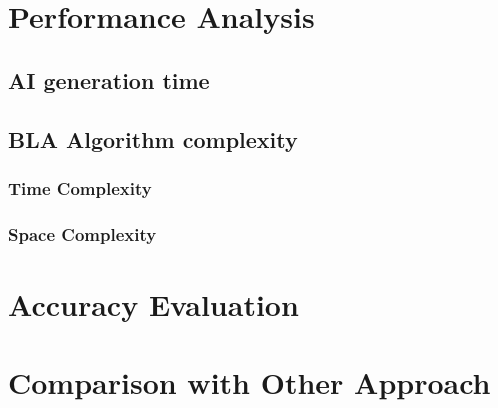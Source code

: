 \section{Performance Analysis}

\subsection{AI generation time}

\subsection{BLA Algorithm complexity}

\subsubsection{Time Complexity}

\subsubsection{Space Complexity}

\section{Accuracy Evaluation}


\section{Comparison with Other Approach}
